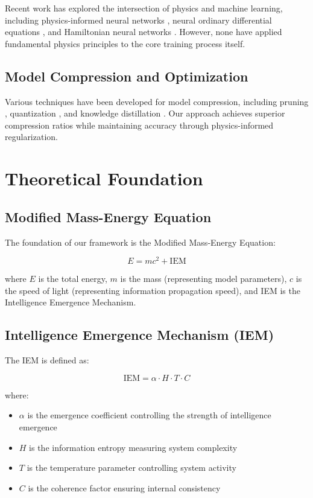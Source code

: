\documentclass[12pt]{article}
\begin{document}
Recent work has explored the intersection of physics and machine learning, including physics-informed neural networks \cite{raissi2019physics}, neural ordinary differential equations \cite{chen2018neural}, and Hamiltonian neural networks \cite{greydanus2019hamiltonian}. However, none have applied fundamental physics principles to the core training process itself.

\subsection{Model Compression and Optimization}

Various techniques have been developed for model compression, including pruning \cite{lecun1989optimal}, quantization \cite{hubara2016quantized}, and knowledge distillation \cite{hinton2015distilling}. Our approach achieves superior compression ratios while maintaining accuracy through physics-informed regularization.

\section{Theoretical Foundation}

\subsection{Modified Mass-Energy Equation}

The foundation of our framework is the Modified Mass-Energy Equation:

\begin{equation}
E = mc^2 + \text{IEM}
\end{equation}

where $E$ is the total energy, $m$ is the mass (representing model parameters), $c$ is the speed of light (representing information propagation speed), and IEM is the Intelligence Emergence Mechanism.

\subsection{Intelligence Emergence Mechanism (IEM)}

The IEM is defined as:

\begin{equation}
\text{IEM} = \alpha \cdot H \cdot T \cdot C
\end{equation}

where:
\begin{itemize}
\item $\alpha$ is the emergence coefficient controlling the strength of intelligence emergence
\item $H$ is the information entropy measuring system complexity
\item $T$ is the temperature parameter controlling system activity
\item $C$ is the coherence factor ensuring internal consistency
\end{itemize}
\end{document}
